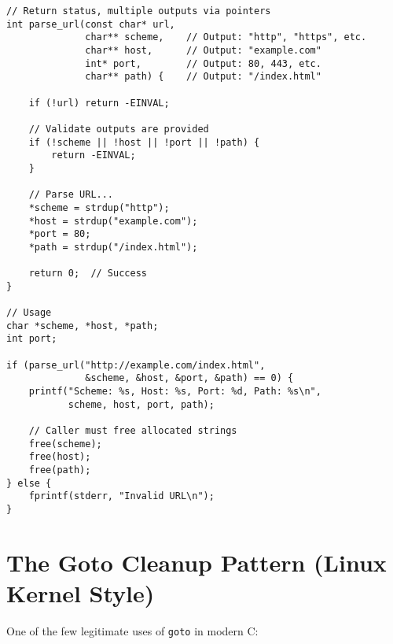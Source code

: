 \begin{lstlisting}
// Return status, multiple outputs via pointers
int parse_url(const char* url,
              char** scheme,    // Output: "http", "https", etc.
              char** host,      // Output: "example.com"
              int* port,        // Output: 80, 443, etc.
              char** path) {    // Output: "/index.html"

    if (!url) return -EINVAL;

    // Validate outputs are provided
    if (!scheme || !host || !port || !path) {
        return -EINVAL;
    }

    // Parse URL...
    *scheme = strdup("http");
    *host = strdup("example.com");
    *port = 80;
    *path = strdup("/index.html");

    return 0;  // Success
}

// Usage
char *scheme, *host, *path;
int port;

if (parse_url("http://example.com/index.html",
              &scheme, &host, &port, &path) == 0) {
    printf("Scheme: %s, Host: %s, Port: %d, Path: %s\n",
           scheme, host, port, path);

    // Caller must free allocated strings
    free(scheme);
    free(host);
    free(path);
} else {
    fprintf(stderr, "Invalid URL\n");
}
\end{lstlisting}

\section{The Goto Cleanup Pattern (Linux Kernel Style)}

One of the few legitimate uses of \texttt{goto} in modern C:

